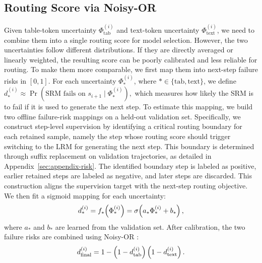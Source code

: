 \documentclass[11pt]{article}
\begin{document}
\subsection{Routing Score via Noisy-OR}
\label{sec:3.4}

Given table-token uncertainty $\Phi_{\text{tab}}^{(i)}$ and text-token uncertainty $\Phi_{\text{text}}^{(i)}$, we need to combine them into a single routing score for model selection. However, the two uncertainties follow different distributions. If they are directly averaged or linearly weighted, the resulting score can be poorly calibrated and less reliable for routing. To make them more comparable, we first map them into next-step failure risks in $[0,1]$.
For each uncertainty $\Phi_*^{(i)}$, where $* \in \{\text{tab}, \text{text}\}$, we define
$
d_*^{(i)} \approx \Pr(\text{SRM fails on } s_{i+1} \mid \Phi_*^{(i)}),
$
which measures how likely the SRM is to fail if it is used to generate the next step. To estimate this mapping, we build two offline failure-risk mappings on a held-out validation set. Specifically, we construct step-level supervision by identifying a critical routing boundary for each retained sample, namely the step whose routing score should trigger switching to the LRM for generating the next step. This boundary is determined through suffix replacement on validation trajectories, as detailed in Appendix~\ref{sec:appendix-risk}. The identified boundary step is labeled as positive, earlier retained steps are labeled as negative, and later steps are discarded. This construction aligns the supervision target with the next-step routing objective.
We then fit a sigmoid mapping for each uncertainty:
\begin{equation}
d_*^{(i)} = f_*\!\left(\Phi_*^{(i)}\right)
= \sigma\!\left(a_* \Phi_*^{(i)} + b_*\right),
\vspace{-6pt}
\end{equation}
where $a_*$ and $b_*$ are learned from the validation set. After calibration, the two failure risks are combined using Noisy-OR \citep{pearl2014probabilistic}:
\begin{equation}
d_{\text{final}}^{(i)} = 1 - \left(1 - d_{\text{tab}}^{(i)}\right)\left(1 - d_{\text{text}}^{(i)}\right).
\vspace{-10pt}
\end{equation}
\end{document}
